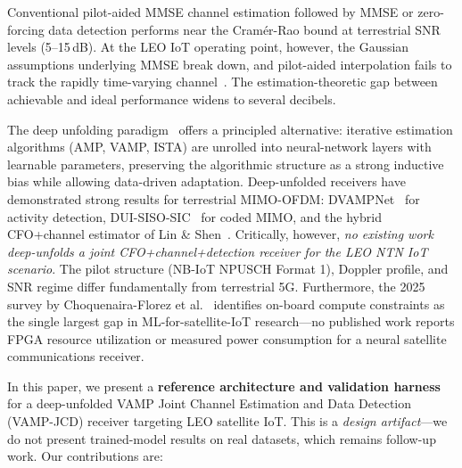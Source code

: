 \documentclass{article}
\begin{document}
Conventional pilot-aided MMSE channel estimation followed by MMSE or zero-forcing data detection performs near the Cram\'er-Rao bound at terrestrial SNR levels (5--15\,dB). At the LEO IoT operating point, however, the Gaussian assumptions underlying MMSE break down, and pilot-aided interpolation fails to track the rapidly time-varying channel~\cite{vaswani2017attention,3gppTR38811}. The estimation-theoretic gap between achievable and ideal performance widens to several decibels.

The deep unfolding paradigm~\cite{gregor2010learning,borgerding2017amp,monga2021algorithm} offers a principled alternative: iterative estimation algorithms (AMP, VAMP, ISTA) are unrolled into neural-network layers with learnable parameters, preserving the algorithmic structure as a strong inductive bias while allowing data-driven adaptation. Deep-unfolded receivers have demonstrated strong results for terrestrial MIMO-OFDM: DVAMPNet~\cite{hou2025dvampnet} for activity detection, DUI-SISO-SIC~\cite{dui2024} for coded MIMO, and the hybrid CFO+channel estimator of Lin \& Shen~\cite{lin2024hybrid}. Critically, however, \emph{no existing work deep-unfolds a joint CFO+channel+detection receiver for the LEO NTN IoT scenario}. The pilot structure (NB-IoT NPUSCH Format 1), Doppler profile, and SNR regime differ fundamentally from terrestrial 5G. Furthermore, the 2025 survey by Choquenaira-Florez et al.~\cite{choquenaira2025ml} identifies on-board compute constraints as the single largest gap in ML-for-satellite-IoT research---no published work reports FPGA resource utilization or measured power consumption for a neural satellite communications receiver.

In this paper, we present a \textbf{reference architecture and validation harness} for a deep-unfolded VAMP Joint Channel Estimation and Data Detection (VAMP-JCD) receiver targeting LEO satellite IoT. This is a \emph{design artifact}---we do not present trained-model results on real datasets, which remains follow-up work. Our contributions are:
\end{document}
